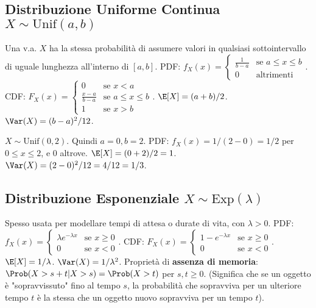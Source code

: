 \subsection{Distribuzione Uniforme Continua \texorpdfstring{$X \sim \text{Unif}(a,b)$}{X ~ Unif(a,b)}}
Una v.a. $X$ ha la stessa probabilità di assumere valori in qualsiasi sottointervallo di uguale lunghezza all'interno di $[a,b]$.
PDF: $f_X(x) = \begin{cases} \frac{1}{b-a} & \text{se } a \le x \le b \\ 0 & \text{altrimenti} \end{cases}$.
CDF: $F_X(x) = \begin{cases} 0 & \text{se } x < a \\ \frac{x-a}{b-a} & \text{se } a \le x \le b \\ 1 & \text{se } x > b \end{cases}$.
$\E[X] = (a+b)/2$.
$\Var(X) = (b-a)^2/12$.
\begin{example}[Esercizio 3, 17/07/2024]
$X \sim \text{Unif}(0,2)$.
Quindi $a=0, b=2$.
PDF: $f_X(x) = 1/(2-0) = 1/2$ per $0 \le x \le 2$, e 0 altrove.
$\E[X] = (0+2)/2 = 1$.
$\Var(X) = (2-0)^2/12 = 4/12 = 1/3$.
\end{example}

\subsection{Distribuzione Esponenziale \texorpdfstring{$X \sim \text{Exp}(\lambda)$}{X ~ Exp(lambda)}}
Spesso usata per modellare tempi di attesa o durate di vita, con $\lambda > 0$.
PDF: $f_X(x) = \begin{cases} \lambda e^{-\lambda x} & \text{se } x \ge 0 \\ 0 & \text{se } x < 0 \end{cases}$.
CDF: $F_X(x) = \begin{cases} 1 - e^{-\lambda x} & \text{se } x \ge 0 \\ 0 & \text{se } x < 0 \end{cases}$.
$\E[X] = 1/\lambda$.
$\Var(X) = 1/\lambda^2$.
Proprietà di \textbf{assenza di memoria}: $\Prob(X > s+t | X > s) = \Prob(X > t)$ per $s, t \ge 0$.
(Significa che se un oggetto è "sopravvissuto" fino al tempo $s$, la probabilità che sopravviva per un ulteriore tempo $t$ è la stessa che un oggetto nuovo sopravviva per un tempo $t$).

